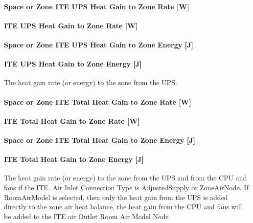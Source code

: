 \paragraph{Space or Zone ITE UPS Heat Gain to Zone Rate {[}W{]}}\label{zone-ite-ups-heat-gain-to-zone-rate-w}

\paragraph{ITE UPS Heat Gain to Zone Rate {[}W{]}}\label{ite-ups-heat-gain-to-zone-rate-w}

\paragraph{Space or Zone ITE UPS Heat Gain to Zone Energy {[}J{]}}\label{zone-ite-ups-heat-gain-to-zone-energy-j}

\paragraph{ITE UPS Heat Gain to Zone Energy {[}J{]}}\label{ite-ups-heat-gain-to-zone-energy-j}

The heat gain rate (or energy) to the zone from the UPS.

\paragraph{Space or Zone ITE Total Heat Gain to Zone Rate {[}W{]}}\label{zone-ite-total-heat-gain-to-zone-rate-w}

\paragraph{ITE Total Heat Gain to Zone Rate {[}W{]}}\label{ite-total-heat-gain-to-zone-rate-w}

\paragraph{Space or Zone ITE Total Heat Gain to Zone Energy {[}J{]}}\label{zone-ite-total-heat-gain-to-zone-energy-j}

\paragraph{ITE Total Heat Gain to Zone Energy {[}J{]}}\label{ite-total-heat-gain-to-zone-energy-j}

The heat gain rate (or energy) to the zone from the UPS and from the CPU and fans if the ITE. Air Inlet Connection Type is AdjustedSupply or ZoneAirNode. If RoomAirModel is selected, then only the heat gain from the UPS is added directly to the zone air heat balance, the heat gain from the CPU and fans will be added to the ITE air Outlet Room Air Model Node

